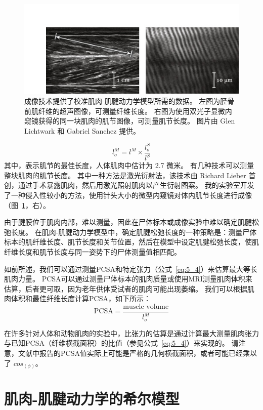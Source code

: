 \begin{figure}[!htb]
	\centering
	\includegraphics[width=0.75\linewidth]{chap5/5_10}
	\caption{成像技术提供了校准肌肉-肌腱动力学模型所需的数据。
		左图为胫骨前肌纤维的超声图像，可测量纤维长度。
		右图为使用双光子显微内窥镜获得的同一块肌肉的肌节图像，可测量肌节长度。
		图片由 Glen Lichtwark 和 Gabriel Sanchez 提供。 \label{fig:5_10}}
\end{figure}

\begin{equation}
	l_o^M = l^M \times \frac{l_o^S}{l^S}
	\label{eq:5_6}
\end{equation}
%
其中，表示肌节的最佳长度，人体肌肉中估计为 2.7 微米。
有几种技术可以测量整块肌肉的肌节长度。
其中一种方法是激光衍射法，该技术由 Richard Lieber 首创，通过手术暴露肌肉，然后用激光照射肌肉以产生衍射图案\cite{lieber1984sarcomere}。
我的实验室开发了一种侵入性较小的方法\cite{llewellyn2008minimally}，使用针头大小的微型内窥镜对体内肌节长度进行成像（图~\ref{fig:5_10}，右）。


由于腱膜位于肌肉内部，难以测量，因此在尸体标本或成像实验中难以确定肌腱松弛长度。
在肌肉-肌腱动力学模型中，确定肌腱松弛长度的一种策略是：测量尸体标本的肌纤维长度、肌节长度和关节位置，然后在模型中设定肌腱松弛长度，使肌纤维长度和肌节长度与同一姿势下的尸体测量值相匹配。


如前所述，我们可以通过测量PCSA和特定张力（公式~\ref{eq:5_4}）来估算最大等长肌肉力量。
PCSA可以通过测量尸体标本的肌肉质量或使用MRI测量肌肉体积来估算，后者更可取，因为老年供体受试者的肌肉可能出现萎缩。
我们可以根据肌肉体积和最佳纤维长度计算PCSA，如下所示：
\begin{equation}
	\text{PCSA} = \frac{\text{muscle volume}}{l_o^M}
\end{equation}
%

在许多针对人体和动物肌肉的实验中，比张力的估算是通过计算最大测量肌肉张力与已知PCSA（纤维横截面积）的比值（参见公式~\ref{eq:5_4}）来实现的。
请注意，文献中报告的PCSA值实际上可能是严格的几何横截面积，或者可能已经乘以了 $cos_(\phi)$。



\section{肌肉-肌腱动力学的希尔模型}

